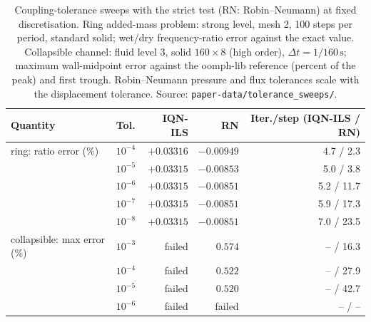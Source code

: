\begin{table}[htbp]
	\centering
	\small
	\caption{Coupling-tolerance sweeps with the strict test (RN: Robin--Neumann) at fixed discretisation. Ring added-mass problem: strong level, mesh 2, 100 steps per period, standard solid; wet/dry frequency-ratio error against the exact value. Collapsible channel: fluid level 3, solid $160\times8$ (high order), $\Delta t = 1/160\,\mathrm{s}$; maximum wall-midpoint error against the oomph-lib reference (percent of the peak) and first trough. Robin--Neumann pressure and flux tolerances scale with the displacement tolerance. Source: \texttt{paper-data/tolerance\_sweeps/}.}
	\label{tab:tol_sweeps}
	\setlength{\tabcolsep}{4pt}
	\begin{tabular}{llrrr}
		\toprule
		Quantity & Tol. & IQN-ILS & RN & Iter./step (IQN-ILS / RN) \\
		\midrule
		ring: ratio error (\%) & $10^{-4}$ & $+0.03316$ & $-0.00949$ & 4.7 / 2.3 \\
		 & $10^{-5}$ & $+0.03315$ & $-0.00853$ & 5.0 / 3.8 \\
		 & $10^{-6}$ & $+0.03315$ & $-0.00851$ & 5.2 / 11.7 \\
		 & $10^{-7}$ & $+0.03315$ & $-0.00851$ & 5.9 / 17.3 \\
		 & $10^{-8}$ & $+0.03315$ & $-0.00851$ & 7.0 / 23.5 \\
		\midrule
		collapsible: max error (\%) & $10^{-3}$ & failed & $0.574$ & -- / 16.3 \\
		 & $10^{-4}$ & failed & $0.522$ & -- / 27.9 \\
		 & $10^{-5}$ & failed & $0.520$ & -- / 42.7 \\
		 & $10^{-6}$ & failed & failed & -- / -- \\
		\bottomrule
	\end{tabular}
\end{table}

